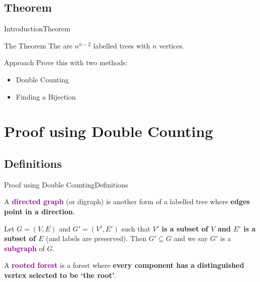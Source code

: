 \documentclass[10pt]{beamer}
\theoremstyle{definition}
\newcommand{\Sone}{Introduction}
\newcommand{\SoneSStheorem}{Theorem}
\newcommand{\Stwo}{Proof using Double Counting}
\newcommand{\StwoSSdefinitions}{Definitions}
\newcommand{\DefColor}{purple}
\begin{document}
\subsection{\SoneSStheorem}
\begin{frame}{\Sone}{\SoneSStheorem}
\begin{block}{The Theorem}
The are $n^{n-2}$ labelled trees with $n$ vertices.
\end{block}

\pause{}

\begin{block}{Approach}
Prove this with two methods:
\begin{itemize}
  \item Double Counting
  \pause{}
  \item Finding a Bijection
\end{itemize}
\end{block}

\end{frame}

\section{\Stwo}
\subsection{\StwoSSdefinitions}
\begin{frame}{\Stwo}{\StwoSSdefinitions}
\begin{definition}
A \textbf{\textcolor{\DefColor}{directed graph}} (or digraph) is another form of a labelled tree where \textbf{edges point in a direction}.
\end{definition}

\pause{}

\begin{definition}
Let $G=(V,E)$ and $G'=(V',E')$ such that \textbf{$V'$ is a subset of $V$ and $E'$ is a subset of $E$} (and labels are preserved). Then $G'\subseteq G$ and we say $G'$ is a \textbf{\textcolor{\DefColor}{subgraph}} of $G$.
\end{definition}

\pause{}

\begin{definition}
A \textbf{\textcolor{\DefColor}{rooted forest}} is a forest where \textbf{every component has a distinguished vertex selected to be `the root'}.
\end{definition}

\end{frame}
\end{document}
